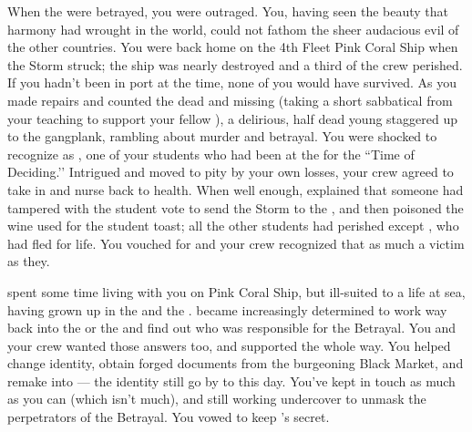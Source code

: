 \documentclass[char]{GL2020}
\begin{document}
When the \pShip{} were betrayed, you were outraged. You, having seen the beauty that harmony had wrought in the world, could not fathom the sheer audacious evil of the other countries. You were back home on the 4th Fleet Pink Coral Ship when the Storm struck; the ship was nearly destroyed and a third of the crew perished. If you hadn't been in port at the time, none of you would have survived. As you made repairs and counted the dead and missing (taking a short sabbatical from your teaching to support your fellow \pShippies{}), a delirious, half dead young \cKidScientist{\person} staggered up to the gangplank, rambling about murder and betrayal. You were shocked to recognize \cKidScientist{\them} as \cKidScientist{\full}, one of your students who had been at the \pSchool{} for the ``Time of Deciding.’’ Intrigued and moved to pity by your own losses, your crew agreed to take \cKidScientist{\them} in and nurse \cKidScientist{\them} back to health. When \cKidScientist{\theywere} well enough, \cKidScientist{} explained that someone had tampered with the student vote to send the Storm to the \pShip{}, and then poisoned the wine used for the student toast; all the other students had perished except \cKidScientist{}, who had fled for \cKidScientist{\their} life. You vouched for \cKidScientist{\them} and your crew recognized that \cKidScientist{\theywere} as much a victim as they. 

\cKidScientist{} spent some time living with you on Pink Coral Ship, but \cKidScientist{\theywere} ill-suited to a life at sea, having grown up in the \pTech{} and the \pFarm{}. \cKidScientist{\They} became increasingly determined to work \cKidScientist{\their} way back into the \pFarm{} or the \pTech{} and find out who was responsible for the Betrayal. You and your crew wanted those answers too, and supported \cKidScientist{\them} the whole way. You helped \cKidScientist{\them} change \cKidScientist{\their} identity, obtain forged documents from the burgeoning Black Market, and remake \cKidScientist{\them} into \cAssistantScientist{\full} — the identity \cKidScientist{\they} still go\cKidScientist{\verbes} by to this day. You’ve kept in touch as much as you can (which isn’t much), and \cKidScientist{\theyare} still working undercover to unmask the perpetrators of the Betrayal. You vowed to keep \cKidScientist{}’s secret.
\end{document}
